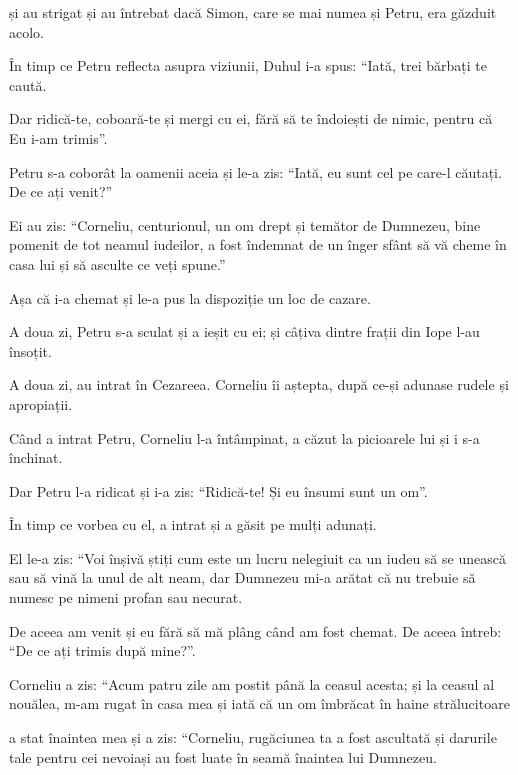 {și au strigat și au întrebat dacă Simon, care se mai numea și Petru, era găzduit acolo.

În timp ce Petru reflecta asupra viziunii, Duhul i-a spus: “Iată, trei bărbați te caută.

Dar ridică-te, coboară-te și mergi cu ei, fără să te îndoiești de nimic, pentru că Eu i-am trimis”.


\par }{\PP {}Petru s-a coborât la oamenii aceia și le-a zis: “Iată, eu sunt cel pe care-l căutați. De ce ați venit?”


\par }{\PP {}Ei au zis: “Corneliu, centurionul, un om drept și temător de Dumnezeu, bine pomenit de tot neamul iudeilor, a fost îndemnat de un înger sfânt să vă cheme în casa lui și să asculte ce veți spune.”

Așa că i-a chemat și le-a pus la dispoziție un loc de cazare.

\par }{\PP A doua zi, Petru s-a sculat și a ieșit cu ei; și câțiva dintre frații din Iope l-au însoțit.

A doua zi, au intrat în Cezareea. Corneliu îi aștepta, după ce-și adunase rudele și apropiații.

Când a intrat Petru, Corneliu l-a întâmpinat, a căzut la picioarele lui și i s-a închinat.

Dar Petru l-a ridicat și i-a zis: “Ridică-te! Și eu însumi sunt un om”.

În timp ce vorbea cu el, a intrat și a găsit pe mulți adunați.

El le-a zis: “Voi înșivă știți cum este un lucru nelegiuit ca un iudeu să se unească sau să vină la unul de alt neam, dar Dumnezeu mi-a arătat că nu trebuie să numesc pe nimeni profan sau necurat.

De aceea am venit și eu fără să mă plâng când am fost chemat. De aceea întreb: “De ce ați trimis după mine?”.


\par }{\PP {}Corneliu a zis: “Acum patru zile am postit până la ceasul acesta; și la ceasul al nouălea,
m-am rugat în casa mea și iată că un om îmbrăcat în haine strălucitoare

a stat înaintea mea și a zis: “Corneliu, rugăciunea ta a fost ascultată și darurile tale pentru cei nevoiași au fost luate în seamă înaintea lui Dumnezeu.

}
